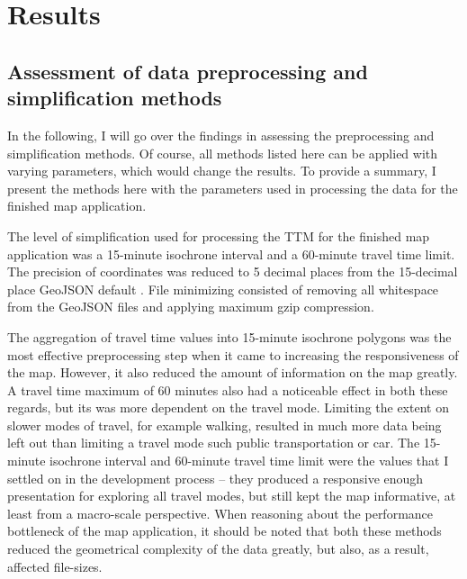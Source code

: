\section{Results}

\subsection{Assessment of data preprocessing and simplification methods}


In the following, I will go over the findings in assessing the preprocessing and simplification methods.
Of course, all methods listed here can be applied with varying parameters,
which would change the results.
To provide a summary,
I present the methods here with the parameters used in processing the data for the finished map application.


The level of simplification used for
processing the TTM for the finished map application was
a 15-minute isochrone interval and a 60-minute travel time limit.
The precision of coordinates was reduced to 5 decimal places
from the 15-decimal place GeoJSON default \parencite{geojsonspec}.
File minimizing consisted of removing all whitespace from the GeoJSON files
and applying maximum gzip compression.

The aggregation of travel time values into 15-minute isochrone polygons was the most 
effective preprocessing step when it came to increasing the responsiveness of the map.
However, it also reduced the amount of information on the map greatly.
A travel time maximum of 60 minutes also had a noticeable effect in both these regards,
but its was more dependent on the travel mode.
Limiting the extent on slower modes of travel, for example walking,
resulted in much more data being left out than limiting a travel mode such public transportation or car.
The 15-minute isochrone interval and 60-minute travel time limit
were the values that I settled on in the development process --
they produced a responsive enough presentation for exploring all travel modes,
but still kept the map informative, at least from a macro-scale perspective.
When reasoning about the performance bottleneck of the map application,
it should be noted that both these methods reduced the geometrical complexity of the data greatly,
but also, as a result, affected file-sizes.




